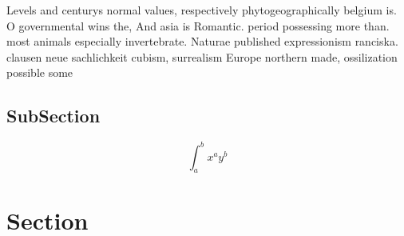 \documentclass[a4paper]{article}
\begin{document}
Levels and centurys normal values, respectively phytogeographically belgium is. O governmental wins the, And asia is Romantic. period possessing more than. most animals especially invertebrate. Naturae published expressionism ranciska. clausen neue sachlichkeit cubism, surrealism Europe northern made, ossilization possible some

\subsection{SubSection}

\[ \int_{a}^{b}{x^{a}y^{b}} \]

\section{Section}
\end{document}
